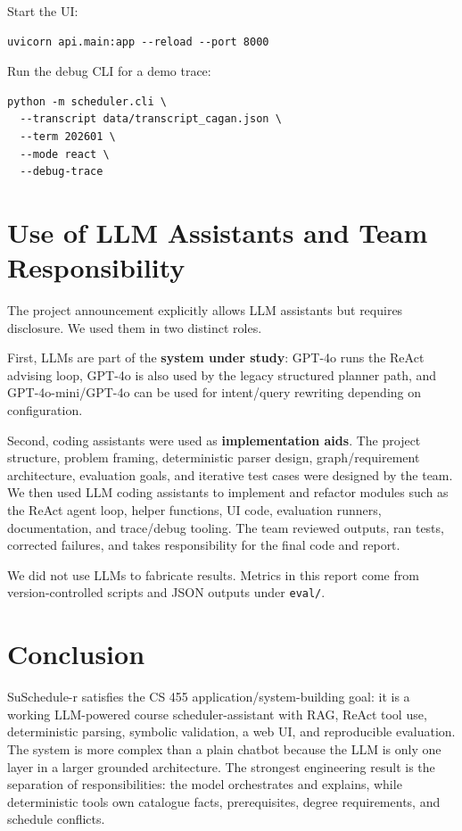 \documentclass[10pt,letterpaper]{article}
\newcommand{\code}[1]{\texttt{#1}}
\begin{document}
Start the UI:
\begin{lstlisting}
uvicorn api.main:app --reload --port 8000
\end{lstlisting}

Run the debug CLI for a demo trace:
\begin{lstlisting}
python -m scheduler.cli \
  --transcript data/transcript_cagan.json \
  --term 202601 \
  --mode react \
  --debug-trace
\end{lstlisting}

\section{Use of LLM Assistants and Team Responsibility}

The project announcement explicitly allows LLM assistants but requires disclosure. We used them in two distinct roles.

First, LLMs are part of the \textbf{system under study}: GPT-4o runs the ReAct advising loop, GPT-4o is also used by the legacy structured planner path, and GPT-4o-mini/GPT-4o can be used for intent/query rewriting depending on configuration.

Second, coding assistants were used as \textbf{implementation aids}. The project structure, problem framing, deterministic parser design, graph/requirement architecture, evaluation goals, and iterative test cases were designed by the team. We then used LLM coding assistants to implement and refactor modules such as the ReAct agent loop, helper functions, UI code, evaluation runners, documentation, and trace/debug tooling. The team reviewed outputs, ran tests, corrected failures, and takes responsibility for the final code and report.

We did not use LLMs to fabricate results. Metrics in this report come from version-controlled scripts and JSON outputs under \code{eval/}.

\section{Conclusion}

SuSchedule-r satisfies the CS 455 application/system-building goal: it is a working LLM-powered course scheduler-assistant with RAG, ReAct tool use, deterministic parsing, symbolic validation, a web UI, and reproducible evaluation. The system is more complex than a plain chatbot because the LLM is only one layer in a larger grounded architecture. The strongest engineering result is the separation of responsibilities: the model orchestrates and explains, while deterministic tools own catalogue facts, prerequisites, degree requirements, and schedule conflicts.
\end{document}
